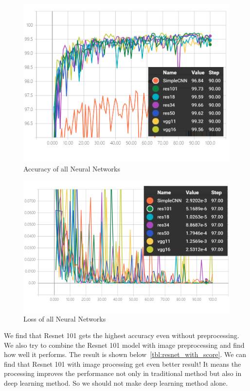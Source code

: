 \documentclass{article}
\begin{document}
\begin{figure}[!htb]
	\centering\includegraphics[width=\textwidth]{fig/acc-total.png}
	\caption{Accuracy of all Neural Networks}\label{fig:acc-total}
\end{figure}

\begin{figure}[!htb]
	\centering\includegraphics[width=\textwidth]{fig/loss-total.png}
	\caption{Loss of all Neural Networks}\label{fig:loss-total}
\end{figure}

 We find that Resnet 101 gets the highest accuracy even without preprocessing. We also try to combine the Resnet 101 model with image preprocessing and find how well it performs. The result is shown below~\ref{tbl:resnet_with_score}. We can find that Resnet 101 with image processing get even better result! It means the processing improves the performance not only in traditional method but also in deep learning method. So we should not make deep learning method alone.
 
\end{document}
